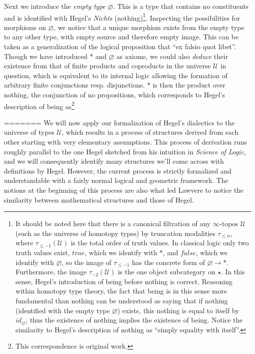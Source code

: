 \documentclass{article}
\begin{document}
Next we introduce the \emph{empty type} $\varnothing$. This is a type that contains no constituents and is 
identified with Hegel's \emph{Nichts} (nothing)\footnote{It should be noted here that there is a canonical 
filtration of any $\infty$-topos $\mathcal{U}$ (such as the universe of homotopy types) by truncation 
modalities $\tau_{\leq n}$, where $\tau_{\leq -1}(\mathcal{U})$ is the total order of truth values. In 
classical logic only two truth values exist, $true$, which we identify with $*$, and $false$, which we 
identify with $\varnothing$, so the image of $\tau_{\leq -1}$ has the concrete form of 
$\varnothing\rightarrow *$. Furthermore, the image $\tau_{-2}(\mathcal{U})$ is the one object subcategory on 
$\star$. In this sense, Hegel's introduction of being before nothing is correct. Reasoning within homotopy 
type theory, the fact that being is in this sense more fundamental than nothing can be understood as saying 
that if nothing (identified with the empty type $\varnothing$) exists, this nothing is equal to itself by 
$id_\varnothing$, thus the existence of nothing implies the existence of being. Notice the similarity to 
Hegel's description of nothing as ``simply equality with itself''.}. Inspecting the possibilities for 
morphisms on $\varnothing$, we notice that a unique morphism exists from the empty type to any other type, 
with empty source and therefore empty image. This can be taken as a generalization of the logical proposition
that ``ex falsio quot libet''. \\

Though we have introduced $*$ and $\varnothing$ as axioms, we could also \emph{deduce} their existence from 
that of finite products and coproducts in the universe $\mathcal{U}$ in question, which is equivalent to its 
internal logic allowing the formation of arbitrary finite conjunctions resp. disjunctions. $*$ is then the 
product over nothing, the conjunction of no propositions, which corresponds to Hegel's description of being 
as\footnote{This correspondence is original work.} 

=======
We will now apply our formalization of Hegel's dialectics to the universe of types $\mathcal{U}$, which
results in a process of structures derived from each other starting with very elementary assumptions.
This process of derivation runs roughly parallel to the one Hegel sketched from his intuition in \emph{Science
of Logic}, and we will consequently identify many structures we'll come across with definitions by Hegel.
However, the current process is strictly formalized and understandable with a fairly normal logical and
geometric framework. The notions at the beginning of this process are also what led Lawvere to notice
the similarity between mathematical structures and those of Hegel. \\
\end{document}
